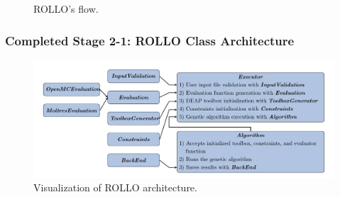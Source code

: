 \begin{frame}
\begin{minipage}[c]{0.4\textwidth}
\begin{figure}
        \caption{ROLLO's flow.}
    \end{figure}
\end{minipage}
\end{frame}

\begin{frame}
    \frametitle{Completed Stage 2-1: ROLLO Class Architecture}
    \begin{figure}
        \centering
        \includegraphics[width=\linewidth]{figures/rollo-architecture.png} 
        \caption{Visualization of ROLLO architecture.}
    \end{figure}
\end{frame}